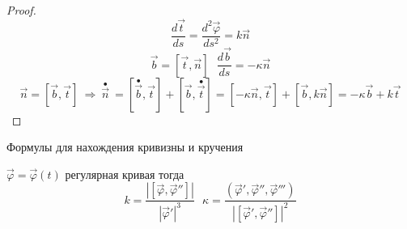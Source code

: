 \begin{proof}
  $$
  \frac{d\vec t}{ds} = \frac{d^2 \vec \varphi}{ds^2} = k \vec n
  $$
  $$
  \vec b = [\vec t, \vec n] ~~~ \frac{d\vec b}{ds} = - \kappa \vec n
  $$
  $$
  \vec n = [\vec b, \vec t] ~ \Rightarrow ~ \stackrel{\bullet}{\vec n}~ =
  [\stackrel{\bullet}{\vec b}, \vec t] + [\vec b, \stackrel{\bullet}{\vec t}]
  = [-\kappa \vec n, \vec t] + [\vec b, k \vec n] = -\kappa \vec b + k \vec t
  $$
\end{proof}

\begin{title}[\Large]
  Формулы для нахождения кривизны и кручения
\end{title}

\begin{block}
  $\vec \varphi = \vec \varphi(t)$ регулярная кривая тогда
  $$
  k = \frac{|[\vec \varphi, \vec \varphi'']|}{|\vec \varphi'|^3} ~~~
  \kappa = \frac{( \vec \varphi', \vec \varphi'', \vec \varphi''')}
  {|[\vec \varphi', \vec \varphi'']|^2}
  $$
\end{block}

